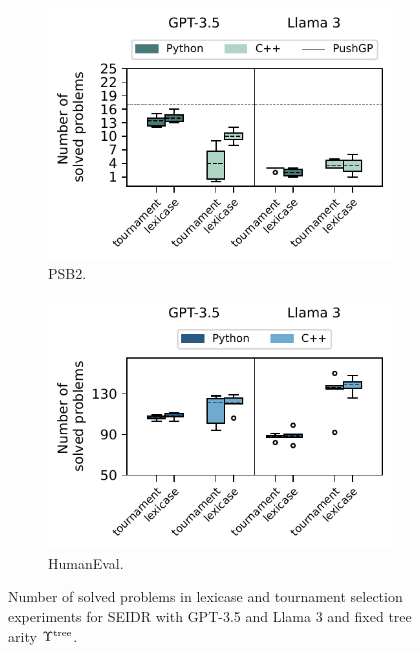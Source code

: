 


\begin{figure}
\begin{subfigure}{0.5\linewidth}
\centering
\includegraphics[width=\linewidth, trim={0mm 4mm 0mm 0mm}]{images/num_solved_problem_lexicase_psb2_6runs_boxplot_v5.pdf}
  \caption{PSB2.}
  \label{fig:num-solved-lexicase-selection-psb2}
\end{subfigure}
\begin{subfigure}{0.5\linewidth}
\centering
\includegraphics[width=\linewidth, trim={0mm 4mm 0mm 0mm}]{images/num_solved_problem_lexicase_humaneval_6runs_boxplot_v5.pdf}
  \caption{HumanEval.}
  \label{fig:num-solved-lexicase-selection-he}
\end{subfigure}
\caption{Number of solved problems in lexicase and tournament selection experiments for SEIDR with GPT-3.5 and Llama 3 and fixed tree arity $\Upsilon^\text{tree}$.}
\label{fig:num-solved-lexicase-selection}
\end{figure}


